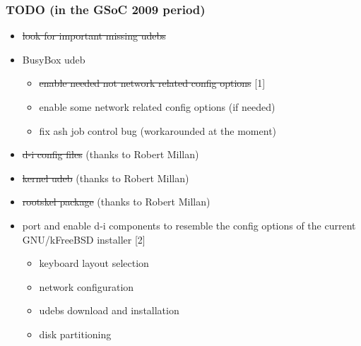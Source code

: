 \documentclass{beamer}
\begin{document}
\begin{frame}
  \frametitle{TODO (in the GSoC 2009 period)}

  \begin{itemize}
  \item
    \st{look for important missing udebs}
  \item
    BusyBox udeb
    \begin{itemize}
    \item
      \st{enable needed not network related config options} [1]
    \item
      enable some network related config options (if needed)
    \item
      fix ash job control bug (workarounded at the moment)
    \end{itemize}
  \item
    \st{d-i config files} (thanks to Robert Millan)
  \item
    \st{kernel udeb} (thanks to Robert Millan)
  \item
    \st{rootskel package} (thanks to Robert Millan)
  \item
    port and enable d-i components to resemble the config options of the current GNU/kFreeBSD installer [2]
    \begin{itemize}
    \item
      keyboard layout selection
    \item
      network configuration
    \item
      udebs download and installation
    \item
      disk partitioning
    \end{itemize}
  \end{itemize}

\end{frame}
\end{document}
